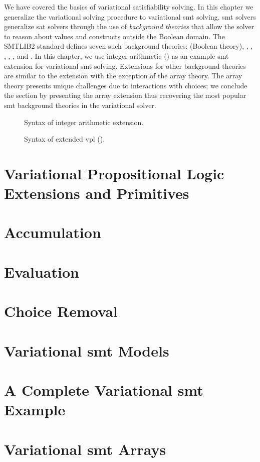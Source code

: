 \label{chapter:vsmt}
%
We have covered the basics of variational satisfiability solving. In this
chapter we generalize the variational solving procedure to variational \ac{smt}
solving.
\ac{smt} solvers generalize \ac{sat} solvers through the use of \emph{background
  theories} that allow the solver to reason about values and constructs outside
the Boolean domain. The SMTLIB2 standard defines seven such background theories:
 (Boolean theory), , ,
, , , and . In this chapter,
we use integer arithmetic () as an example \ac{smt} extension for
variational \ac{smt} solving. Extensions for other background theories are
similar to the  extension with the exception of the array theory. The
array theory presents unique challenges due to interactions with choices; we
conclude the section by presenting the array extension thus recovering the most
popular \ac{smt} background theories in the variational solver.
\begin{figure}
  \centering
  
  \caption{Syntax of integer arithmetic extension.}%
  \label{fig:arith:stx}
\end{figure}
%
\begin{figure}

\centering
\caption{Syntax of extended \ac{vpl} (\evpl{}).}%
\label{fig:arith:vpl}
\end{figure}
%
\section{Variational Propositional Logic Extensions and Primitives}
%

\section{Accumulation}
%

\section{Evaluation}
%

\section{Choice Removal}
%

\section{Variational \ac{smt} Models}
%

\section{A Complete Variational \ac{smt} Example}


\section{Variational \ac{smt} Arrays}


